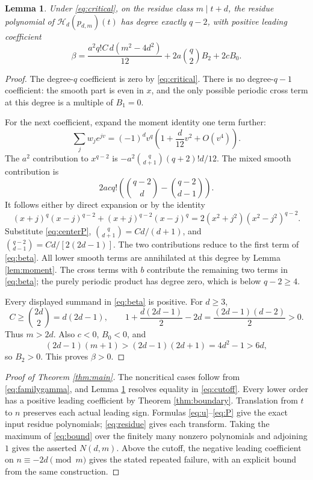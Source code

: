 \documentclass[11pt,reqno]{amsart}
\newtheorem{lemma}[theorem]{Lemma}
\theoremstyle{remark}
\newcommand{\cenLag}{\mathcal{H}}
\begin{document}
\begin{lemma}\label{lem:beta}
Under \eqref{eq:critical}, on the residue class \(m\mid t+d\), the residue polynomial of
\(\cenLag_d(p_{d,m})(t)\) has degree exactly \(q-2\), with positive leading
coefficient
\begin{equation}\label{eq:beta}
 \beta=
 \frac{a^2q!C\,d(m^2-4d^2)}{12}
 +2a\binom q2 B_2+2cB_0.
\end{equation}
\end{lemma}
\begin{proof}
The degree-\(q\) coefficient is zero by \eqref{eq:critical}.
There is no degree-\(q-1\) coefficient: the smooth part is even in \(x\),
and the only possible periodic cross term at this degree is a multiple
of \(B_1=0\).

For the next coefficient, expand the moment identity one term further:
\[
 \sum_jw_je^{jv}=(-1)^dv^q
                   \left(1+\frac{d}{12}v^2+O(v^4)\right).
\]
The \(a^2\) contribution to \(x^{q-2}\) is
\(-a^2\binom q{d+1}(q+2)!d/12\). The mixed smooth contribution is
\[
 2acq!\left(\binom{q-2}{d}-\binom{q-2}{d-1}\right).
\]
It follows either by direct expansion or by the identity
\[
 (x+j)^q(x-j)^{q-2}+(x+j)^{q-2}(x-j)^q
       =2(x^2+j^2)(x^2-j^2)^{q-2}.
\]
Substitute \eqref{eq:centerP},
\(\binom q{d+1}=Cd/(d+1)\), and
\(\binom{q-2}{d-1}=Cd/[2(2d-1)]\).
The two contributions reduce to the first term of \eqref{eq:beta}.
All lower smooth terms are annihilated at this degree by
Lemma \ref{lem:moment}. The cross terms with \(b\) contribute the remaining
two terms in \eqref{eq:beta}; the purely periodic product has degree zero,
which is below \(q-2\ge4\).

Every displayed summand in \eqref{eq:beta} is positive.
For \(d\ge3\),
\[
 C\ge\binom{2d}{2}=d(2d-1),\qquad
 1+\frac{d(2d-1)}2-2d=\frac{(2d-1)(d-2)}2>0.
\]
Thus \(m>2d\). Also \(c<0\), \(B_0<0\), and
\[
 (2d-1)(m+1)>(2d-1)(2d+1)=4d^2-1>6d,
\]
so \(B_2>0\). This proves \(\beta>0\).
\end{proof}

\begin{proof}[Proof of Theorem \ref{thm:main}]
The noncritical cases follow from \eqref{eq:familygamma}, and
Lemma \ref{lem:beta} resolves equality in \eqref{eq:cutoff}.
Every lower order has a positive leading coefficient by
Theorem \ref{thm:boundary}. Translation from \(t\) to \(n\) preserves
each actual leading sign. Formulas \eqref{eq:u}--\eqref{eq:P} give the exact
input residue polynomials; \eqref{eq:residue} gives each transform.
Taking the maximum of \eqref{eq:bound} over the finitely many nonzero
polynomials and adjoining \(1\) gives the asserted \(N(d,m)\).
Above the cutoff, the negative leading coefficient on
\(n\equiv-2d\pmod m\) gives the stated repeated failure, with an explicit
bound from the same construction.
\end{proof}
\end{document}
